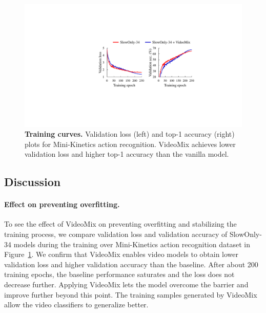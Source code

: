 \begin{figure}[!t]
\centering
\includegraphics[width=\linewidth]{arxiv_videomix/main/figures/valloss.pdf}
\caption{\textbf{Training curves.} Validation loss (left) and top-1 accuracy (right) plots for Mini-Kinetics action recognition. VideoMix achieves lower validation loss and higher top-1 accuracy than the vanilla model.}
\label{fig:videomix:loss_plot}
\end{figure}



\subsection{Discussion}

\paragraph{Effect on preventing overfitting.}

To see the effect of VideoMix on preventing overfitting and stabilizing the training process, we compare validation loss and validation accuracy of SlowOnly-34 models during the training over Mini-Kinetics action recognition dataset in 
Figure~\ref{fig:videomix:loss_plot}.
We confirm that VideoMix enables video models to obtain lower validation loss and higher validation accuracy than the baseline. 
After about 200 training epochs, the baseline performance saturates and the loss does not decrease further.
Applying VideoMix lets the model overcome the barrier and improve further beyond this point. The training samples generated by VideoMix allow the video classifiers to generalize better.

